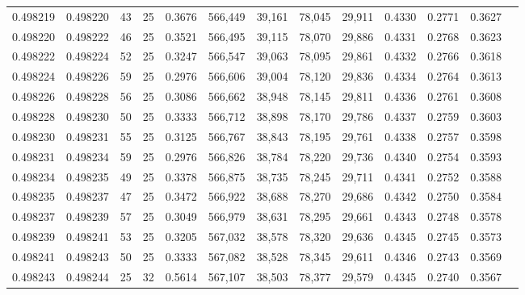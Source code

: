 \begin{tabular}{rrrrrrrrrrrrr}
0.498219 & 0.498220 &    43 &  25 &                                     0.3676 & 566,449 &  39,161 &  78,045 &  29,911 & 0.4330 & 0.2771 & 0.3627 \\
0.498220 & 0.498222 &    46 &  25 &                                     0.3521 & 566,495 &  39,115 &  78,070 &  29,886 & 0.4331 & 0.2768 & 0.3623 \\
0.498222 & 0.498224 &    52 &  25 &                                     0.3247 & 566,547 &  39,063 &  78,095 &  29,861 & 0.4332 & 0.2766 & 0.3618 \\
0.498224 & 0.498226 &    59 &  25 &                                     0.2976 & 566,606 &  39,004 &  78,120 &  29,836 & 0.4334 & 0.2764 & 0.3613 \\
0.498226 & 0.498228 &    56 &  25 &                                     0.3086 & 566,662 &  38,948 &  78,145 &  29,811 & 0.4336 & 0.2761 & 0.3608 \\
0.498228 & 0.498230 &    50 &  25 &                                     0.3333 & 566,712 &  38,898 &  78,170 &  29,786 & 0.4337 & 0.2759 & 0.3603 \\
0.498230 & 0.498231 &    55 &  25 &                                     0.3125 & 566,767 &  38,843 &  78,195 &  29,761 & 0.4338 & 0.2757 & 0.3598 \\
0.498231 & 0.498234 &    59 &  25 &                                     0.2976 & 566,826 &  38,784 &  78,220 &  29,736 & 0.4340 & 0.2754 & 0.3593 \\
0.498234 & 0.498235 &    49 &  25 &                                     0.3378 & 566,875 &  38,735 &  78,245 &  29,711 & 0.4341 & 0.2752 & 0.3588 \\
0.498235 & 0.498237 &    47 &  25 &                                     0.3472 & 566,922 &  38,688 &  78,270 &  29,686 & 0.4342 & 0.2750 & 0.3584 \\
0.498237 & 0.498239 &    57 &  25 &                                     0.3049 & 566,979 &  38,631 &  78,295 &  29,661 & 0.4343 & 0.2748 & 0.3578 \\
0.498239 & 0.498241 &    53 &  25 &                                     0.3205 & 567,032 &  38,578 &  78,320 &  29,636 & 0.4345 & 0.2745 & 0.3573 \\
0.498241 & 0.498243 &    50 &  25 &                                     0.3333 & 567,082 &  38,528 &  78,345 &  29,611 & 0.4346 & 0.2743 & 0.3569 \\
0.498243 & 0.498244 &    25 &  32 &                                     0.5614 & 567,107 &  38,503 &  78,377 &  29,579 & 0.4345 & 0.2740 & 0.3567 \\

\end{tabular}
